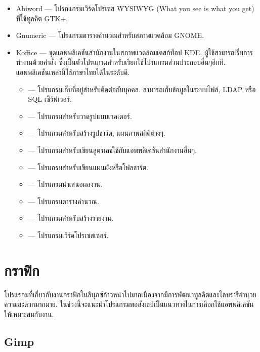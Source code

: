 \begin{thwbr}
\begin{itemize}
\item Abiword --- โปรกแกรมเวิร์ดโปรเซส WYSIWYG (What you see is what you get) ที่ใช้ทูลคิต GTK+. 
\item Gnumeric --- โปรแกรมตารางคำนวณสำหรับสภาพแวดล้อม GNOME.
\item Koffice --- ชุดแอพพลิเคชันสำนักงานในสภาพแวดล้อมเดสก์ท็อป KDE. ผู้ใช้สามารถเริ่มการทำงานด้วยคำสั่ง  ซึ่งเป็นตัวโปรแกรมสำหรับเรียกใช้โปรแกรมส่วนประกอบอื่นๆอีกที. แอพพลิเคชันเหล่านี้ใช้ภาษาไทยได้ในระดับดี.
\begin{itemize} 
\item {} --- โปรแกรมเก็บที่อยู่สำหรับติดต่อกับบุคคล. สามารถเก็บข้อมูลในระบบไฟล์, LDAP หรือ SQL เซิร์ฟเวอร์.
\item {} ---  โปรแกรมสำหรับวาดรูปแบบเวคเตอร์.
\item {} --- โปรแกรมสำหรับสร้างรูปชาร์ต, แผนภาพสถิติต่างๆ.
\item {} --- โปรแกรมสำหรับเขียนสูตรเลขใช้กับแอพพลิเคชันสำนักงานอื่นๆ.
\item {} --- โปรแกรมสำหรับเขียนแผนผังหรือโฟลชาร์ต.
\item {} --- โปรแกรมนำเสนอผลงาน.
\item {} --- โปรแกรมตารางคำนวณ.
\item {} --- โปรแกรมสำหรับสร้างรายงาน.
\item {} --- โปรแกรมเวิร์ดโปรเซสเซอร์.
\end{itemize}
\end{itemize}

\begin{figure}[!hbt]
\end{figure}



\section{กราฟิก}
โปรแรกมที่เกี่ยวกับงานกราฟิกในลินุกซ์ก้าวหน้าไปมากเนื่องจากมีการพัฒนาทูลคิตและไลบรารีอำนวยความสะดวกมากมาย. ในช่วงนี้จะแนะนำโปรแกรมพอสังเขปเป็นแนวทางในการเลือกใช้แอพพลิเคชันให้เหมาะสมกับงาน.

\subsection{Gimp}
\begin{figure}[!hbt]
\end{figure}


\end{thwbr}
